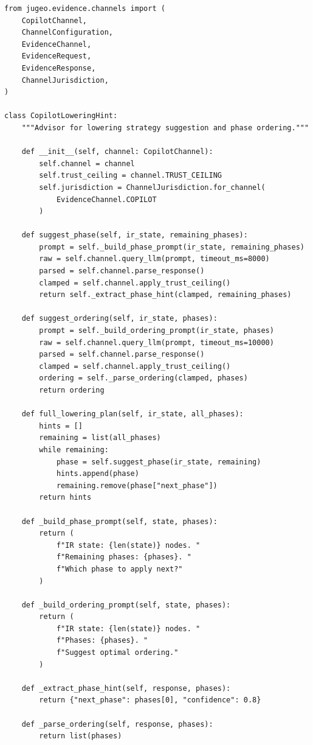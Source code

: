 \documentclass[11pt]{article}
\begin{document}
\begin{lstlisting}[style=jugeo-python,
  caption={Lowering hint generation via CopilotChannel},
  label={lst:lowhint}]
from jugeo.evidence.channels import (
    CopilotChannel,
    ChannelConfiguration,
    EvidenceChannel,
    EvidenceRequest,
    EvidenceResponse,
    ChannelJurisdiction,
)

class CopilotLoweringHint:
    """Advisor for lowering strategy suggestion and phase ordering."""

    def __init__(self, channel: CopilotChannel):
        self.channel = channel
        self.trust_ceiling = channel.TRUST_CEILING
        self.jurisdiction = ChannelJurisdiction.for_channel(
            EvidenceChannel.COPILOT
        )

    def suggest_phase(self, ir_state, remaining_phases):
        prompt = self._build_phase_prompt(ir_state, remaining_phases)
        raw = self.channel.query_llm(prompt, timeout_ms=8000)
        parsed = self.channel.parse_response()
        clamped = self.channel.apply_trust_ceiling()
        return self._extract_phase_hint(clamped, remaining_phases)

    def suggest_ordering(self, ir_state, phases):
        prompt = self._build_ordering_prompt(ir_state, phases)
        raw = self.channel.query_llm(prompt, timeout_ms=10000)
        parsed = self.channel.parse_response()
        clamped = self.channel.apply_trust_ceiling()
        ordering = self._parse_ordering(clamped, phases)
        return ordering

    def full_lowering_plan(self, ir_state, all_phases):
        hints = []
        remaining = list(all_phases)
        while remaining:
            phase = self.suggest_phase(ir_state, remaining)
            hints.append(phase)
            remaining.remove(phase["next_phase"])
        return hints

    def _build_phase_prompt(self, state, phases):
        return (
            f"IR state: {len(state)} nodes. "
            f"Remaining phases: {phases}. "
            f"Which phase to apply next?"
        )

    def _build_ordering_prompt(self, state, phases):
        return (
            f"IR state: {len(state)} nodes. "
            f"Phases: {phases}. "
            f"Suggest optimal ordering."
        )

    def _extract_phase_hint(self, response, phases):
        return {"next_phase": phases[0], "confidence": 0.8}

    def _parse_ordering(self, response, phases):
        return list(phases)
\end{lstlisting}
\end{document}
